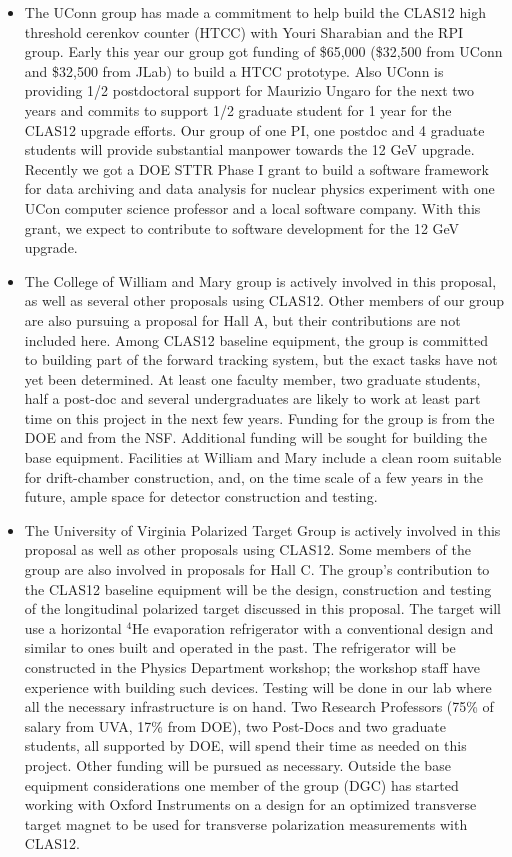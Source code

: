 \documentclass[12pt]{article}
\begin{document}
\begin{itemize}
\item
The UConn group has made a commitment to help build the CLAS12 high threshold cerenkov counter
 (HTCC) with Youri Sharabian and the RPI group. Early this year our group got funding of \$65,000 
(\$32,500 from UConn and \$32,500 from JLab) to build a HTCC prototype. Also UConn is providing 
1/2 postdoctoral support for Maurizio Ungaro for the next two years and commits to support 1/2 graduate 
student for 1 year for the CLAS12 upgrade efforts.  Our group of one PI, one postdoc and 4 graduate 
students will provide substantial manpower towards the 12 GeV upgrade.
Recently we got a DOE STTR Phase I grant to build a software framework for data archiving and data 
analysis for nuclear physics experiment with one UCon computer science professor and a local software company. 
With this grant, we expect to contribute to software development for the 12 GeV upgrade.

\item
The College of William and Mary group is actively involved in this  proposal, as
well as several other proposals using CLAS12.  Other members of our  group are also
pursuing a proposal for Hall A, but their contributions are not  included here.
Among CLAS12 baseline equipment, the group is committed
to building part of the forward tracking system, but the exact
tasks have not yet been determined.  At least one faculty member, two
graduate students, half a post-doc and several undergraduates are
likely to work at least part time on this project in the next
few years.  Funding for the group is from the DOE and from the NSF.
Additional funding will be sought for building the base equipment.
Facilities at William and Mary include a clean room suitable for  drift-chamber
construction, and, on the time scale of a few years in the future,  ample space
for detector construction and testing.

\item
The University of Virginia Polarized Target Group is actively involved in this
proposal as well as other proposals using CLAS12. Some members of the group
are also involved in proposals for Hall C.
The group's contribution to the CLAS12 baseline equipment will be the
design, construction and testing of the longitudinal polarized target
discussed in this proposal. The target  will use a horizontal  $^{4}$He
evaporation refrigerator with a conventional design and similar to ones built
and operated in the past. The refrigerator will be constructed in the Physics
Department workshop; the workshop staff have experience with building such
devices. Testing will be done in our lab where all the necessary
infrastructure is on hand. 
Two Research Professors (75\% of salary from UVA, 17\% from DOE), two Post-Docs
and two graduate students, all supported by DOE, will spend their time as
needed on this project. Other funding will be pursued as necessary.
Outside the base equipment considerations one member of the group (DGC) has started
working with Oxford Instruments on a design for an optimized transverse target
magnet to be used for transverse polarization measurements with CLAS12.

\end{itemize}
\end{document}
